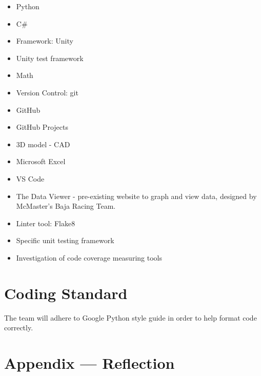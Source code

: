 \documentclass{article}
\begin{document}

\begin{itemize}
\item Python
\item C\#
\item Framework: Unity
\item Unity test framework
\item Math
\item Version Control: git
\item GitHub
\item GitHub Projects
\item 3D model - CAD
\item Microsoft Excel
\item VS Code
\item The Data Viewer - pre-existing website to graph and view data, designed by McMaster's Baja Racing Team.
\item Linter tool: Flake8
\item Specific unit testing framework
\item Investigation of code coverage measuring tools
\end{itemize}

\section{Coding Standard}

The team will adhere to Google Python style guide in order to help format code correctly. 

\newpage{}

\section*{Appendix --- Reflection}


\end{document}
